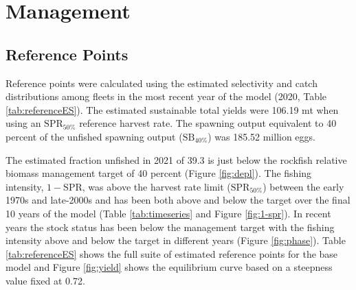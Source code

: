\documentclass[11pt,
  english,
  a4paper,
]{article}
\begin{document}
\leavevmode\tagmcend\tagstructend\par


\hypertarget{management}{%
\section{Management}\label{management}}

\leavevmode\tagmcend\tagstructend


\hypertarget{reference-points}{%
\subsection{Reference Points}\label{reference-points}}

\leavevmode\tagmcend\tagstructend


Reference points were calculated using the estimated selectivity and catch distributions among fleets in the most recent year of the model (2020, Table \ref{tab:referenceES}). The estimated sustainable total yields were 106.19 mt when using an {\(\text{SPR}_{50\%}\)\leavevmode\tagmcend\tagstructend} reference harvest rate. The spawning output equivalent to 40 percent of the unfished spawning output ({\(\text{SB}_{40\%}\)\leavevmode\tagmcend\tagstructend}) was 185.52 million eggs.

\leavevmode\tagmcend\tagstructend\par


The estimated fraction unfished in 2021 of 39.3 is just below the rockfish relative biomass management target of 40 percent (Figure \ref{fig:depl}). The fishing intensity, {\(1-\text{SPR}\)\leavevmode\tagmcend\tagstructend}, was above the harvest rate limit ({\(\text{SPR}_{50\%}\)\leavevmode\tagmcend\tagstructend}) between the early 1970s and late-2000s and has been both above and below the target over the final 10 years of the model (Table \ref{tab:timeseries} and Figure \ref{fig:1-spr}). In recent years the stock status has been below the management target with the fishing intensity above and below the target in different years (Figure \ref{fig:phase}). Table \ref{tab:referenceES} shows the full suite of estimated reference points for the base model and Figure \ref{fig:yield} shows the equilibrium curve based on a steepness value fixed at 0.72.
\end{document}
